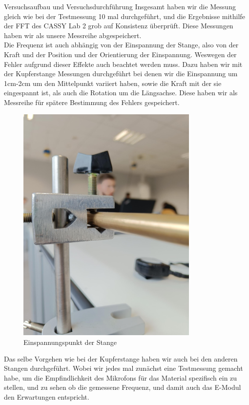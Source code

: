 \documentclass[twoside]{protokoll}
\begin{document}
\begin{aufgabe}{Versuchsaufbau und Versuchsdurchführung}
Insgesamt haben wir die Messung gleich wie bei der Testmessung 10 mal durchgeführt, und die Ergebnisse mithilfe der FFT des CASSY Lab 2 grob auf Konsistenz überprüft. Diese Messungen haben wir als unsere Messreihe abgespeichert.\\

Die Frequenz ist auch abhängig von der Einspannung der Stange, also von der Kraft und der Position und der Orientierung der Einspannung. Weswegen der Fehler aufgrund dieser Effekte auch beachtet werden muss. Dazu haben wir mit der Kupferstange Messungen durchgeführt bei denen wir die Einspannung um 1cm-2cm um den Mittelpunkt variiert haben, sowie die Kraft mit der sie eingespannt ist, als auch die Rotation um die Längsachse.
Diese haben wir als Messreihe für spätere Bestimmung des Fehlers gespeichert.\\

\begin{figure}[H]
  \centering
  \includegraphics[width=0.8\textwidth]{Bilder/434170_428396_1A3_Einspannung2.pdf}
  \caption{Einspannungspunkt der Stange}
  \centering
\end{figure}

Das selbe Vorgehen wie bei der Kupferstange haben wir auch bei den anderen Stangen durchgeführt. Wobei wir jedes mal zunächst eine Testmessung gemacht habe, um die Empfindlichkeit des Mikrofons für das Material spezifisch ein zu stellen, und zu sehen ob die gemessene Frequenz, und damit auch das E-Modul den Erwartungen entspricht. 


\end{aufgabe}
\end{document}
